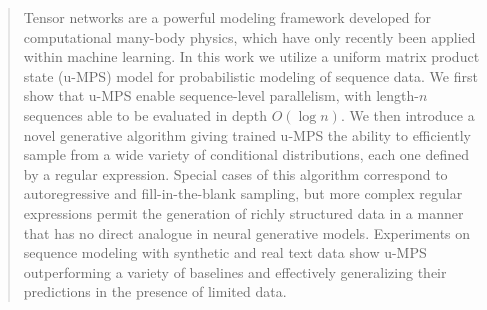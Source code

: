 \documentclass[twoside]{article}
\begin{document}


\begin{abstract}

Tensor networks are a powerful modeling framework developed for computational many-body physics, which have only recently been applied within machine learning. In this work we utilize a uniform matrix product state (u-MPS) model for probabilistic modeling of sequence data. We first show that u-MPS enable sequence-level parallelism, with length-$n$ sequences able to be evaluated in depth $O(\log n)$. We then introduce a novel generative algorithm giving trained u-MPS the ability to efficiently sample from a wide variety of conditional distributions, each one defined by a regular expression. Special cases of this algorithm correspond to autoregressive and fill-in-the-blank sampling, but more complex regular expressions permit the generation of richly structured data in a manner that has no direct analogue in neural generative models. Experiments on sequence modeling with synthetic and real text data show u-MPS outperforming a variety of baselines and effectively generalizing their predictions in the presence of limited data.

\end{abstract}
\end{document}
